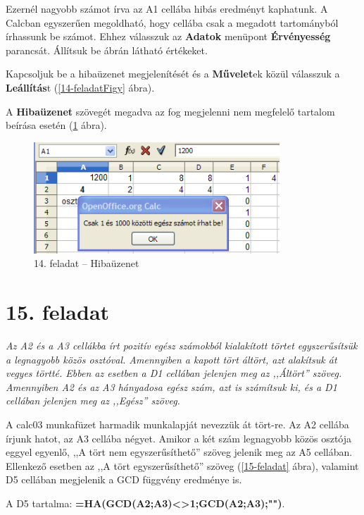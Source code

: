 Ezernél nagyobb számot írva az A1 cellába hibás eredményt
kaphatunk. A Calcban egyszerűen megoldható, hogy cellába csak a
megadott tartományból írhassunk be számot. Ehhez válasszuk az
\textbf{Adatok} menüpont \textbf{Érvényesség} parancsát.
Állítsuk be  ábrán látható értékeket.

Kapcsoljuk be a hibaüzenet megjelenítését és a
\textbf{Művelet}ek közül válasszuk a
\textbf{Leállítás}t (\ref{14-feladatFigy} ábra).  

A \textbf{Hibaüzenet} szövegét megadva az fog megjelenni nem
megfelelő tartalom beírása esetén (\ref{14-feladatHiba} ábra).

\begin{figure}[!h]
\begin{center}
\includegraphics[width=9.238cm]{oocalcv2-img83.png}
\caption{14.  feladat -- Hibaüzenet}\label{14-feladatHiba}
\end{center}
\end{figure}


\section{15. feladat}
{\itshape
Az A2 és a A3 cellákba írt pozitív egész számokból
kialakított törtet egyszerűsítsük a legnagyobb közös
osztóval. Amennyiben a kapott tört áltört, azt alakítsuk át
vegyes törtté. Ebben az esetben a D1 cellában jelenjen meg az
,,Áltört'' szöveg. Amennyiben A2
és az A3 hányadosa egész szám, azt is számítsuk ki, és a
D1 cellában jelenjen meg az
,,Egész'' szöveg.}

A calc03 munkafüzet harmadik munkalapját nevezzük át tört-re.
Az A2 cellába írjunk hatot, az A3  cellába négyet. Amikor a
két szám legnagyobb közös osztója eggyel egyenlő,
,,A tört nem
egyszerűsíthető'' szöveg jelenik meg az
A5 cellában. Ellenkező esetben az ,,A tört
egyszerűsíthető'' szöveg (\ref{15-feladat} ábra),
valamint D5 cellában megjelenik a GCD függvény eredménye is.

A D5 tartalma:
{\sffamily\bfseries{=HA(GCD(A2;A3)<>1;GCD(A2;A3);"")}}.

